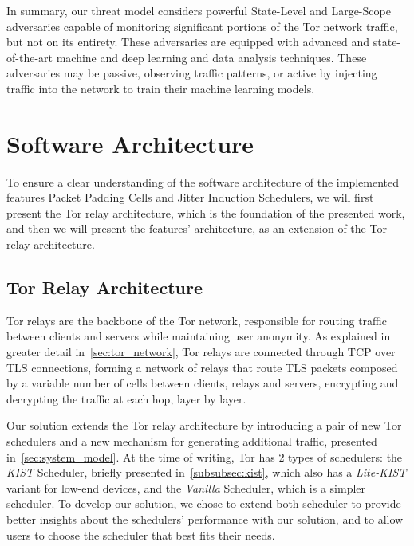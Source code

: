 In summary, our threat model considers powerful State-Level and Large-Scope adversaries capable of monitoring significant portions of the Tor network traffic, but not on its entirety. These adversaries are equipped with advanced and state-of-the-art machine and deep learning and data analysis techniques. These adversaries may be passive, observing traffic patterns, or active by injecting traffic into the network to train their machine learning models. 


\section{Software Architecture}\label{sec:software_architecture}

To ensure a clear understanding of the software architecture of the implemented features Packet Padding Cells and Jitter Induction Schedulers, we will first present the Tor relay architecture, which is the foundation of the presented work, and then we will present the features' architecture, as an extension of the Tor relay architecture.

\subsection{Tor Relay Architecture}\label{sec:tor_relay_architecture}
Tor relays are the backbone of the Tor network, responsible for routing traffic between clients and servers while maintaining user anonymity.  As explained in greater detail in~\autoref{sec:tor_network}, Tor relays are connected through TCP over TLS connections, forming a network of relays that route TLS packets composed by a variable number of cells between clients, relays and servers, encrypting and decrypting the traffic at each hop, layer by layer.

Our solution extends the Tor relay architecture by introducing a pair of new Tor schedulers and a new mechanism for generating additional traffic, presented in~\autoref{sec:system_model}. 
At the time of writing, Tor has 2 types of schedulers: the \textit{KIST} Scheduler, briefly presented in~\autoref{subsubsec:kist}, which also has a \textit{Lite-KIST} variant for low-end devices, and the \textit{Vanilla} Scheduler, which is a simpler scheduler. To develop our solution, we chose to extend both scheduler to provide better insights about the schedulers' performance with our solution, and to allow users to choose the scheduler that best fits their needs.

